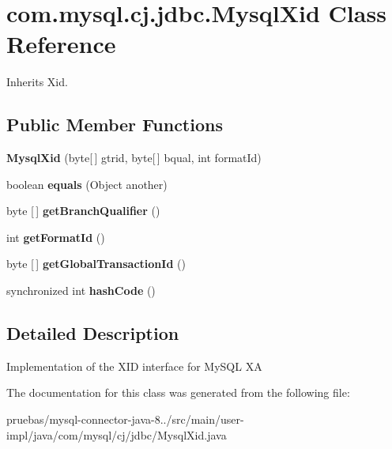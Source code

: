 \hypertarget{classcom_1_1mysql_1_1cj_1_1jdbc_1_1_mysql_xid}{}\section{com.\+mysql.\+cj.\+jdbc.\+Mysql\+Xid Class Reference}
\label{classcom_1_1mysql_1_1cj_1_1jdbc_1_1_mysql_xid}


Inherits Xid.

\subsection*{Public Member Functions}
\begin{DoxyCompactItemize}
\item 
\mbox{\label{classcom_1_1mysql_1_1cj_1_1jdbc_1_1_mysql_xid_a860578c3559c5dab35805d247d002b72}} 
{\bfseries Mysql\+Xid} (byte\mbox{[}$\,$\mbox{]} gtrid, byte\mbox{[}$\,$\mbox{]} bqual, int format\+Id)
\item 
\mbox{\label{classcom_1_1mysql_1_1cj_1_1jdbc_1_1_mysql_xid_a608b026cf00cb37d59c8843327268f58}} 
boolean {\bfseries equals} (Object another)
\item 
\mbox{\label{classcom_1_1mysql_1_1cj_1_1jdbc_1_1_mysql_xid_a0ba0046d36f1442f1bb00ce14fba1099}} 
byte \mbox{[}$\,$\mbox{]} {\bfseries get\+Branch\+Qualifier} ()
\item 
\mbox{\label{classcom_1_1mysql_1_1cj_1_1jdbc_1_1_mysql_xid_a5a4e84399551260bda9e63c03a0692ed}} 
int {\bfseries get\+Format\+Id} ()
\item 
\mbox{\label{classcom_1_1mysql_1_1cj_1_1jdbc_1_1_mysql_xid_a9946171dbb1d2769f3bb05297cd0fdbd}} 
byte \mbox{[}$\,$\mbox{]} {\bfseries get\+Global\+Transaction\+Id} ()
\item 
\mbox{\label{classcom_1_1mysql_1_1cj_1_1jdbc_1_1_mysql_xid_a9e4d859fda8a7556c024889bbf1e9b0f}} 
synchronized int {\bfseries hash\+Code} ()
\end{DoxyCompactItemize}


\subsection{Detailed Description}
Implementation of the X\+ID interface for My\+S\+QL XA 

The documentation for this class was generated from the following file\+:\begin{DoxyCompactItemize}
\item 
pruebas/mysql-\/connector-\/java-\/8../src/main/user-\/impl/java/com/mysql/cj/jdbc/Mysql\+Xid.\+java\end{DoxyCompactItemize}
